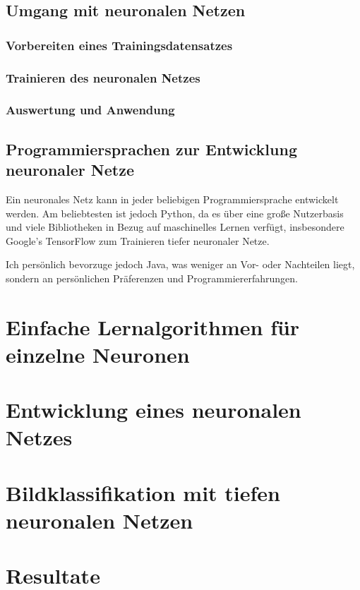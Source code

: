 \documentclass[12pt,a4]{article}
\begin{document}
\subsection{Umgang mit neuronalen Netzen \cite{PythonMachineLearningChapter1}}


\subsubsection{Vorbereiten eines Trainingsdatensatzes}

\subsubsection{Trainieren des neuronalen Netzes}

\subsubsection{Auswertung und Anwendung}

\subsection{Programmiersprachen zur Entwicklung neuronaler Netze \cite{PythonMachineLearningChapter1}}
Ein neuronales Netz kann in jeder beliebigen Programmiersprache entwickelt werden. Am beliebtesten ist jedoch Python, da es über eine große Nutzerbasis und viele Bibliotheken in Bezug auf maschinelles Lernen verfügt, insbesondere Google's TensorFlow zum Trainieren tiefer neuronaler Netze.

Ich persönlich bevorzuge jedoch Java, was weniger an Vor- oder Nachteilen liegt, sondern an persönlichen Präferenzen und Programmiererfahrungen.

\section{Einfache Lernalgorithmen für einzelne Neuronen \cite{PythonMachineLearningChapter2}}

\section{Entwicklung eines neuronalen Netzes \cite{PythonMachineLearningChapter12}}

\section{Bildklassifikation mit tiefen neuronalen Netzen \cite{PythonMachineLearningChapter15}}

\section{Resultate}



\end{document}

